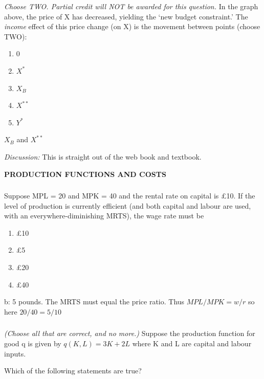 \documentclass[]{article}
\begin{document}
\emph{Choose TWO. Partial credit will NOT be awarded for this question.}
In the graph above, the price of X has decreased, yielding the `new
budget constraint.' The \emph{income} effect of this price change (on X)
is the movement between points (choose TWO):

\begin{enumerate}
\def\labelenumi{\Alph{enumi}.}
\item
  0
\item
  \(X^{\ast}\)
\item
  \(X_B\)
\item
  \(X^{\ast\ast}\)
\item
  \(Y^{\ast}\)
\end{enumerate}

\(X_B\) and \(X^{\ast\ast}\)

\emph{Discussion:} This is straight out of the web book and textbook.

\textbf{PRODUCTION FUNCTIONS AND COSTS}

\hypertarget{section-14}{%
\subsubsection{}\label{section-14}}

Suppose MPL = 20 and MPK = 40 and the rental rate on capital is £10. If
the level of production is currently efficient (and both capital and
labour are used, with an everywhere-diminishing MRTS), the wage rate
must be

\begin{enumerate}
\def\labelenumi{\Alph{enumi}.}
\item
  £10
\item
  £5
\item
  £20
\item
  £40
\end{enumerate}

b: 5 pounds. The MRTS must equal the price ratio. Thus \(MPL/MPK=w/r\)
so here \(20/40=5/10\)

\hypertarget{section-15}{%
\subsubsection{}\label{section-15}}

\emph{(Choose all that are correct, and no more.)} Suppose the
production function for good q is given by \(q(K,L) = 3K + 2L\) where K
and L are capital and labour inputs.

Which of the following statements are true?
\end{document}
